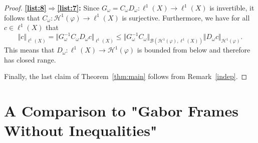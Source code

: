 \documentclass{amsart}
\def\Hil{\mathcal{H}}
\newcommand{\B}[0]{{\mathcal{B}}}
\newcommand{\R}[0]{{\mathbb{R}}}
\newcommand{\N}[0]{{\mathbb{N}}}
\renewcommand{\H}{{\mathcal{H}}}
\begin{document}
\begin{proof}
\textbf{\ref{list:8}$\Rightarrow$\ref{list:7}:}  
Since $G_\omega = C_{\omega} D_{\omega}:\ell^1(X)\to \ell^1(X)$ is invertible, it follows that $C_\omega:\Hil^1(\varphi)\to \ell^1(X)$ is surjective. %
Furthermore, we have for all $c\in \ell^1(X)$ that 
$$\Vert c \Vert_{\ell^1(X)} = \Vert G_\omega^{-1} C_{\omega} D_{\omega} c \Vert_{\ell^1(X)} \leq \Vert G_\omega^{-1} C_{\omega} \Vert_{\B(\Hil^1(\varphi),\ell^1(X))} \Vert D_{\omega} c \Vert_{\Hil^1(\varphi)}.$$
This means that $D_{\omega}: \ell^1(X) \to \Hil^1(\varphi)$ is bounded from below and therefore has closed range.    
%

Finally, the last claim of Theorem~\ref{thm:main} follows from Remark~\ref{indep}.
\end{proof}

\section{A Comparison to "Gabor Frames Without Inequalities"}\label{A Comparison to "Gabor Frames Without Inequalities"}
\end{document}
